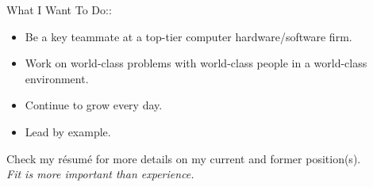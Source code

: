 \documentclass{letter}
\begin{document}
What I Want To Do::

\begin{itemize}
\item Be a key teammate at a top-tier computer hardware/software firm.
\item Work on world-class problems with world-class people in a world-class environment.
\item Continue to grow every day.
\item Lead by example.
\end{itemize}

Check my r\'esum\'e for more details on my current and former position(s).\\
\emph{Fit is more important than experience.}
\end{document}
